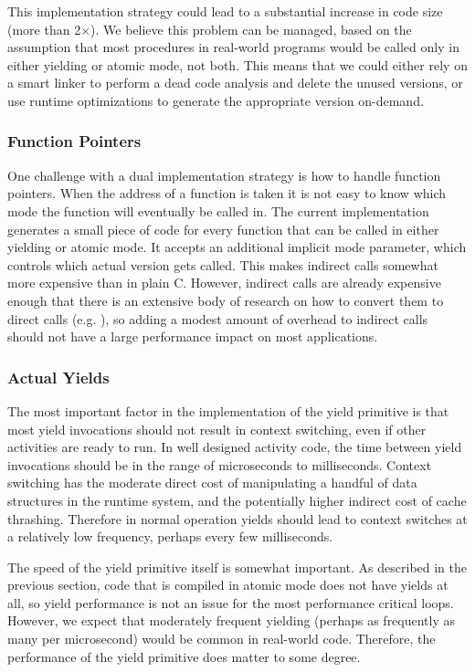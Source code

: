 \documentclass[sigplan,10pt,review,anonymous]{acmart}\settopmatter{printfolios=true,printccs=false,printacmref=false}
\begin{document}
This implementation strategy could lead to a substantial increase in code size (more than 2$\times$).
We believe this problem can be managed, based on the assumption that most procedures in real-world programs would be called only in either yielding or atomic mode, not both.
This means that we could either rely on a smart linker to perform a dead code analysis and delete the unused versions, or use runtime optimizations to generate the appropriate version on-demand.


\subsubsection{Function Pointers}

One challenge with a dual implementation strategy is how to handle function pointers.
When the address of a function is taken it is not easy to know which mode the function will eventually be called in.
The current implementation generates a small piece of code for every function that can be called in either yielding or atomic mode.
It accepts an additional implicit mode parameter, which controls which actual version gets called.
This makes indirect calls somewhat more expensive than in plain C.
However, indirect calls are already expensive enough that there is an extensive body of research on how to convert them to direct calls (e.g. \cite{Dean1995}), so adding a modest amount of overhead to indirect calls should not have a large performance impact on most applications.

\subsubsection{Actual Yields}

The most important factor in the implementation of the yield primitive is that most yield invocations should not result in context switching, even if other activities are ready to run.
In well designed activity code, the time between yield invocations should be in the range of microseconds to milliseconds.
Context switching has the moderate direct cost of manipulating a handful of data structures in the runtime system, and the potentially higher indirect cost of cache thrashing.
Therefore in normal operation yields should lead to context switches at a relatively low frequency, perhaps every few milliseconds.

The speed of the yield primitive itself is somewhat important.
As described in the previous section, code that is compiled in atomic mode does not have yields at all, so yield performance is not an issue for the most performance critical loops.
However, we expect that moderately frequent yielding (perhaps as frequently as many per microsecond) would be common in real-world code.
Therefore, the performance of the yield primitive does matter to some degree.
\end{document}
